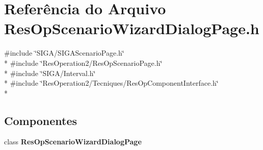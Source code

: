 \section{Referência do Arquivo Res\+Op\+Scenario\+Wizard\+Dialog\+Page.\+h}
\label{_res_op_scenario_wizard_dialog_page_8h}
{\ttfamily \#include \char`\"{}S\+I\+G\+A/\+S\+I\+G\+A\+Scenario\+Page.\+h\char`\"{}}\\*
{\ttfamily \#include \char`\"{}Res\+Operation2/\+Res\+Op\+Scenario\+Page.\+h\char`\"{}}\\*
{\ttfamily \#include \char`\"{}S\+I\+G\+A/\+Interval.\+h\char`\"{}}\\*
{\ttfamily \#include \char`\"{}Res\+Operation2/\+Tecniques/\+Res\+Op\+Component\+Interface.\+h\char`\"{}}\\*
\subsection*{Componentes}
\begin{DoxyCompactItemize}
\item 
class {\bf Res\+Op\+Scenario\+Wizard\+Dialog\+Page}
\end{DoxyCompactItemize}
